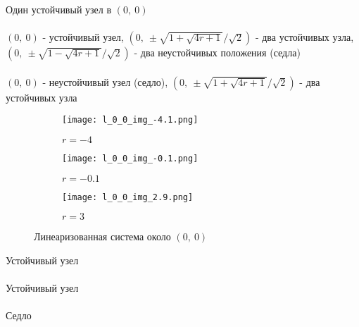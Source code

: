 \documentclass[12pt]{article}
\begin{document}
\begin{center}
    Один устойчивый узел в $(0, \ 0)$ \\
    \downarrow \\
    $(0, \ 0)$ - устойчивый узел, $(0, \ \pm \sqrt{1+\sqrt{4r+1}}/\sqrt{2})$ - два устойчивых узла, 
$(0, \ \pm \sqrt{1-\sqrt{4r+1}}/\sqrt{2})$ - два неустойчивых положения (седла) \\
    \downarrow \\
    $(0, \ 0)$ - неустойчивый узел (седло), $(0, \ \pm \sqrt{1+\sqrt{4r+1}}/\sqrt{2})$ - два устойчивых узла \\
\end{center}

\begin{figure}[H]
     \centering
     \begin{subfigure}[b]{0.3\textwidth}
         \centering
         \texttt{[image: l\_0\_0\_img\_-4.1.png]}
         \caption{$r=-4$}
         \label{fig:l_0_0_img_-4.1.png}
     \end{subfigure}
     \hfill
     \begin{subfigure}[b]{0.3\textwidth}
         \centering
         \texttt{[image: l\_0\_0\_img\_-0.1.png]}
         \caption{$r=-0.1$}
         \label{fig:l_0_0_img_-0.1.png}
     \end{subfigure}
     \hfill
     \begin{subfigure}[b]{0.3\textwidth}
         \centering
         \texttt{[image: l\_0\_0\_img\_2.9.png]}
         \caption{$r=3$}
         \label{fig:l_0_0_img_2.9.png}
     \end{subfigure}
        \caption{Линеаризованная система около $(0,\ 0)$}
        \label{fig:three graphs}
\end{figure}

\begin{center}
    Устойчивый узел \\
    \downarrow \\
    Устойчивый узел \\
    \downarrow \\
    Седло \\
\end{center}
\end{document}
